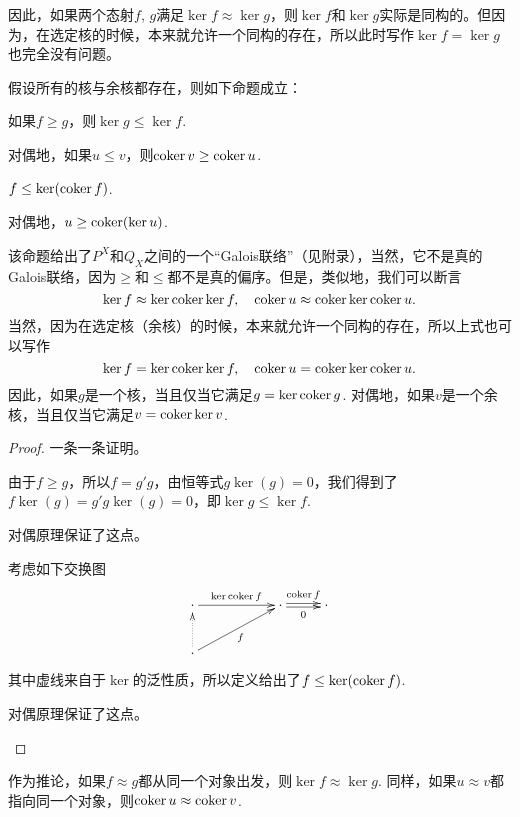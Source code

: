 因此，如果两个态射$f$, $g$满足$\ker f\approx \ker g$，则$\ker f$和$\ker g$实际是同构的。但因为，在选定核的时候，本来就允许一个同构的存在，所以此时写作$\ker f=\ker g$也完全没有问题。

\begin{pro}\label{glgl}假设所有的核与余核都存在，则如下命题成立：
\begin{compactenum}[~~~(1)]
\item 如果$f\geq g$，则$\ker g \leq \ker f$. 
\item 对偶地，如果$u\leq v$，则$\operatorname{coker} v \geq \operatorname{coker} u$. 
\item $f\leq \ker(\operatorname{coker} f)$.
\item 对偶地，$u\geq \operatorname{coker}(\ker u)$.
\end{compactenum}
\end{pro}

该命题给出了$P^X$和$Q_X$之间的一个“Galois联络”（见附录），当然，它不是真的Galois联络，因为$\geq$和$\leq$都不是真的偏序。但是，类似地，我们可以断言
\[
	\ker f\approx \ker \operatorname{coker} \ker f,\quad \operatorname{coker} u \approx \operatorname{coker} \ker \operatorname{coker} u.
\]
当然，因为在选定核（余核）的时候，本来就允许一个同构的存在，所以上式也可以写作
\begin{equation}\label{kck}
\ker f= \ker \operatorname{coker} \ker f,\quad \operatorname{coker} u = \operatorname{coker} \ker \operatorname{coker} u.
\end{equation}
因此，如果$g$是一个核，当且仅当它满足$g=\ker \operatorname{coker} g$. 对偶地，如果$v$是一个余核，当且仅当它满足$v = \operatorname{coker} \ker v$.

\begin{proof}一条一条证明。
\begin{compactenum}[~~~(1)]
\item 由于$f\geq g$，所以$f=g'g$，由恒等式$g\ker(g)=0$，我们得到了$f\ker(g)=g'g\ker(g)=0$，即$\ker g\leq \ker f$. 
\item 对偶原理保证了这点。
\item 考虑如下交换图
\[
\begin{xy}
	\xymatrix{
	\cdot \ar[rr]^-{\ker \coker f}&&\cdot \ar@<0.3ex>[r]^-{\coker f} \ar@<-0.3ex>[r]_-{0}&\cdot \\
	\cdot \ar@{.>}[u]\ar[urr]_f
	}
\end{xy}
\]
其中虚线来自于$\ker$的泛性质，所以定义给出了$f\leq \ker(\operatorname{coker} f)$.
\item 对偶原理保证了这点。
\end{compactenum}
\end{proof}

作为推论，如果$f\approx g$都从同一个对象出发，则$\ker f\approx \ker g$. 同样，如果$u\approx v$都指向同一个对象，则$\operatorname{coker} u \approx \operatorname{coker} v$.

